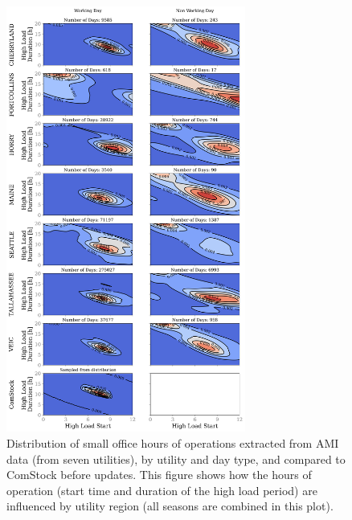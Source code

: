 \begin{figure}
    \centering \includegraphics[width=0.7\textwidth]{figures/small_office_utility.png}
    \caption[Distribution of small office hours of operation, by utility and day type]{Distribution of small office hours of operations extracted from AMI data (from seven utilities), by utility and day type, and compared to ComStock before updates. This figure shows how the hours of operation (start time and duration of the high load period) are influenced by utility region (all seasons are combined in this plot).}
    \label{fig:small_office_utility}
\end{figure}

